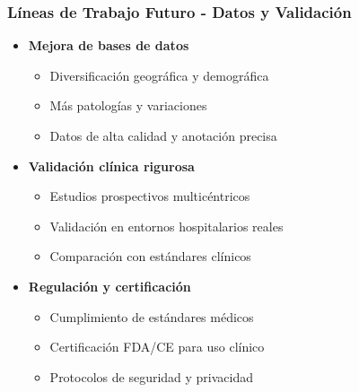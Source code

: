 \begin{frame}
\frametitle{Líneas de Trabajo Futuro - Datos y Validación}
\begin{itemize}
    \item \textbf{Mejora de bases de datos}
    \begin{itemize}
        \item Diversificación geográfica y demográfica
        \item Más patologías y variaciones
        \item Datos de alta calidad y anotación precisa
    \end{itemize}
    \item \textbf{Validación clínica rigurosa}
    \begin{itemize}
        \item Estudios prospectivos multicéntricos
        \item Validación en entornos hospitalarios reales
        \item Comparación con estándares clínicos
    \end{itemize}
    \item \textbf{Regulación y certificación}
    \begin{itemize}
        \item Cumplimiento de estándares médicos
        \item Certificación FDA/CE para uso clínico
        \item Protocolos de seguridad y privacidad
    \end{itemize}
\end{itemize}
\end{frame}

